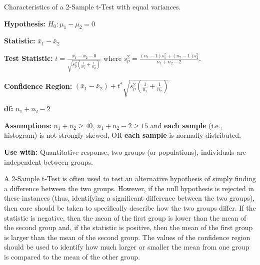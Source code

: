 \documentclass[10pt,openany]{book}\usepackage[]{graphicx}\usepackage[]{color}
\begin{document}
\vspace*{12pt}
\begin{table}[h]
\centering
\colorbox{ltgray}{
\begin{minipage}{.8\textwidth}
  \centering
	\caption{Characteristics of a 2-Sample t-Test with equal variances.}\label{tab:2tspec}
  \begin{Itemize}
      \item \textbf{Hypothesis:} $H_{0}:\mu_{1}-\mu_{2}=0$
      \item \textbf{Statistic:} $\bar{x}_{1}-\bar{x}_{2}$
      \item \textbf{Test Statistic:} $t=\frac{\bar{x}_{1}-\bar{x}_{2}-0}{\sqrt{s_{p}^{2}\left(\frac{1}{n_{1}}+\frac{1}{n_{2}} \right)}}$ where $s_{p}^{2}=\frac{(n_{1}-1)s_{1}^{2}+(n_{2}-1)s_{2}^{2}}{n_{1}+n_{2}-2}$.
      \vspace{6pt}
      \item \textbf{Confidence Region:} $(\bar{x}_{1}-\bar{x}_{2})+t^{*}\sqrt{s_{p}^{2}\left(\frac{1}{n_{1}}+\frac{1}{n_{2}} \right)}$
      \vspace{6pt}
      \item \textbf{df:} $n_{1}+n_{2}-2$
      \item \textbf{Assumptions:} $n_{1}+n_{2}\geq40$, $n_{1}+n_{2}-2\geq15$ and \textbf{each sample} (i.e., histogram) is not strongly skewed, OR \textbf{each sample} is normally distributed.
      \item \textbf{Use with:} Quantitative response, two groups (or populations), individuals are independent between groups.
  \end{Itemize}
\end{minipage}}
\end{table}
\vspace*{12pt}


A 2-Sample t-Test is often used to test an alternative hypothesis of simply finding a difference between the two groups. However, if the null hypothesis is rejected in these instances (thus, identifying a significant difference between the two groups), then care should be taken to specifically describe how the two groups differ. If the statistic is negative, then the mean of the first group is lower than the mean of the second group and, if the statistic is positive, then the mean of the first group is larger than the mean of the second group. The values of the confidence region should be used to identify how much larger or smaller the mean from one group is compared to the mean of the other group.
\end{document}
